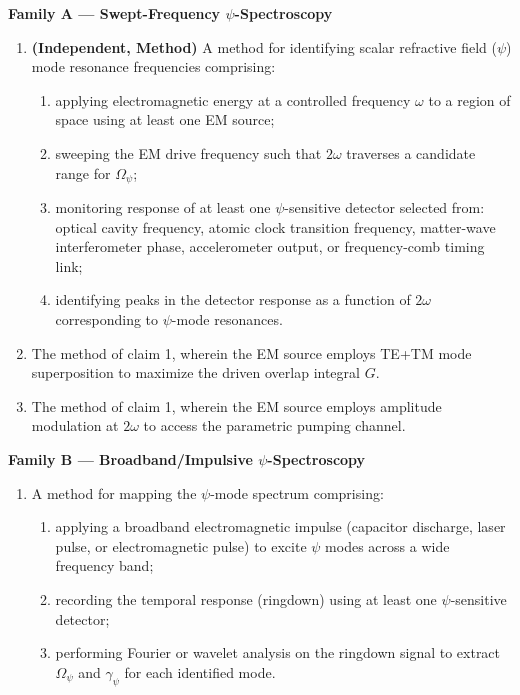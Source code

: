 \documentclass[12pt,letterpaper]{article}
\begin{document}
\begin{tcolorbox}[colback=blue!5!white, colframe=blue!50!black,
title=Patent \#16 -- Proposed Claims]

\textbf{Family A --- Swept-Frequency $\psi$-Spectroscopy}
\begin{enumerate}
\item \textbf{(Independent, Method)} A method for identifying scalar
refractive field ($\psi$) mode resonance frequencies comprising:
\begin{enumerate}[label=(\alph*)]
\item applying electromagnetic energy at a controlled frequency $\omega$
to a region of space using at least one EM source;
\item sweeping the EM drive frequency such that $2\omega$ traverses a
candidate range for $\Omega_\psi$;
\item monitoring response of at least one $\psi$-sensitive detector
selected from: optical cavity frequency, atomic clock transition
frequency, matter-wave interferometer phase, accelerometer output,
or frequency-comb timing link;
\item identifying peaks in the detector response as a function of
$2\omega$ corresponding to $\psi$-mode resonances.
\end{enumerate}

\item The method of claim 1, wherein the EM source employs TE+TM
mode superposition to maximize the driven overlap integral $G$.

\item The method of claim 1, wherein the EM source employs amplitude
modulation at $2\omega$ to access the parametric pumping channel.
\end{enumerate}

\textbf{Family B --- Broadband/Impulsive $\psi$-Spectroscopy}
\begin{enumerate}[resume]
\item A method for mapping the $\psi$-mode spectrum comprising:
\begin{enumerate}[label=(\alph*)]
\item applying a broadband electromagnetic impulse (capacitor discharge,
laser pulse, or electromagnetic pulse) to excite $\psi$ modes across
a wide frequency band;
\item recording the temporal response (ringdown) using at least one
$\psi$-sensitive detector;
\item performing Fourier or wavelet analysis on the ringdown signal to
extract $\Omega_\psi$ and $\gamma_\psi$ for each identified mode.
\end{enumerate}


\end{enumerate}
\end{tcolorbox}
\end{document}
